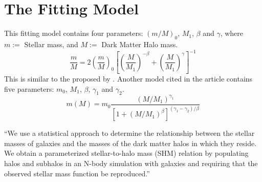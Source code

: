 \section{The Fitting Model}

  This fitting model contains four parameters: $\left(m/M\right)_0$, $M_1$, 
$\beta$ and $\gamma$, 
  where $m:=$ Stellar mass, and $M :=$ Dark Matter Halo mass.
  \begin{equation}
  \frac{m}{M} = 2 \left( \frac{m}{M} \right)_{0} 
		    \left[ \left(\frac{M}{M_1}\right)^{-\beta} + 
\left(\frac{M}{M_1}\right)^{\gamma} \right]^{-1} 
  \end{equation}
  This is similar to the proposed by \cite{moster10}.
  Another model cited in the article contains five parameters: $m_0$, $M_1$, 
$\beta$, $\gamma_1$ and $\gamma_2$.
  \[ m(M) = m_0 \frac{ (M/M_1)^{\gamma_1}}{ \left[ 1 + (M/M_1)^\beta \right]^{ 
(\gamma_1-\gamma_2)/\beta}} \]


   ``We use a statistical approach to determine the relationship between the 
stellar masses of galaxies and the masses
  of the dark matter halos in which they reside. We obtain a parameterized 
stellar-to-halo mass (SHM) relation by
  populating halos and subhalos in an N-body simulation with galaxies and 
requiring that the observed stellar mass
  function be reproduced.'' \citep{moster10}